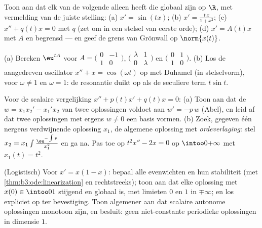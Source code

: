 \begin{exercise}[$\star\star$]\label{exo:b3:ode:3}
Toon aan dat elk van de volgende alleen 
heeft die globaal zijn op $\R$, met vermelding van de juiste
stelling:
(a) $x' = \sin(tx)$;
(b) $x' = \frac{t\,x}{1 + x^2}$;
(c) $x'' + q(t)x = 0$ met $q$  (zet om in een stelsel van
eerste orde);
(d) $x' = A(t)x$ met $A$  en begrensd --- en geef de grens
van Grönwall op $\norm{x(t)}$.
\end{exercise}

\begin{exercise}[$\star\star$]\label{exo:b3:ode:4}
(a) Bereken $\eu^{tA}$ voor
$A = \bigl(\begin{smallmatrix}0 & -1\\ 1 &
0\end{smallmatrix}\bigr)$,
$\bigl(\begin{smallmatrix}\lambda & 1\\ 0 &
\lambda\end{smallmatrix}\bigr)$ en
$\bigl(\begin{smallmatrix}0 & 1\\ 1 &
0\end{smallmatrix}\bigr)$.
(b) Los de aangedreven oscillator $x'' + x = \cos(\omega t)$ op
met Duhamel (in stelselvorm), voor $\omega \neq 1$ en $\omega =
1$: de resonantie duikt op als de seculiere term $t\sin t$.
\end{exercise}

\begin{exercise}[$\star\star$]\label{exo:b3:ode:5}
Voor de scalaire vergelijking $x'' + p(t)x' + q(t)x = 0$:
(a) Toon aan dat de  $w = x_1x_2' - x_1'x_2$ van twee
oplossingen voldoet aan $w' = -p\,w$ (Abel), en leid af dat twee
oplossingen met ergens $w \neq 0$ een basis vormen.
(b) Zoek, gegeven één nergens verdwijnende oplossing $x_1$, de
algemene oplossing met \emph{ordeverlaging}: stel $x_2 =
x_1\int \frac{\eu^{-\int p}}{x_1^2}$ en ga na. Pas toe op $t^2x''
- 2x = 0$ op $\intoo0{+\infty}$ met $x_1(t) = t^2$.
\end{exercise}

\begin{exercise}[$\star\star$]\label{exo:b3:ode:6}
(Logistisch) Voor $x' = x(1 - x)$: bepaal alle evenwichten en hun
stabiliteit (met \cref{thm:b3:ode:linearization} en
rechtstreeks); toon aan dat elke oplossing met $x(0) \in
\intoo01$ stijgend en globaal is, met limieten $0$ en $1$ in
$\mp\infty$; en los expliciet op ter bevestiging. Toon
algemener aan dat scalaire autonome oplossingen monotoon zijn, en
besluit: geen niet-constante periodieke oplossingen in dimensie
$1$.
\end{exercise}


